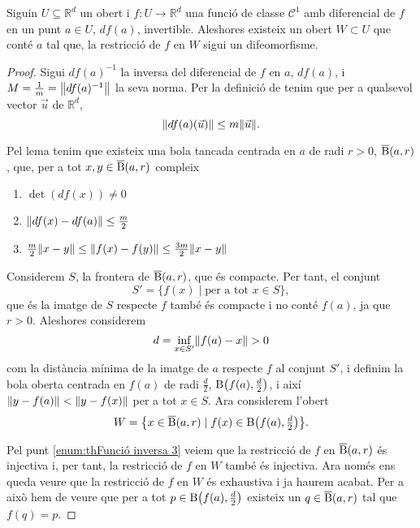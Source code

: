 \documentclass[../Apunts.tex]{subfiles}
\begin{document}
	\begin{theorem}
		\label{thm:Funció inversa}
		Siguin \(U\subseteq\mathbb{R}^{d}\) un obert i \(f\colon U\to\mathbb{R}^{d}\) una funció de classe \(\mathcal{C}^{1}\) amb diferencial de \(f\) en un punt \(a\in U\), \(df(a)\), invertible. Aleshores existeix un obert \(W\subset U\) que conté \(a\) tal que, la restricció de \(f\) en \(W\) sigui un difeomorfisme.
		\begin{proof}
			Sigui \(df(a)^{-1}\) la inversa del diferencial de \(f\) en \(a\), \(df(a)\), i \(M=\frac{1}{m}=\norm{df(a)^{-1}}\) la seva norma. Per la definició de  tenim que per a qualsevol vector \(\vec{u}\) de \(\mathbb{R}^{d}\),
			\[\norm{df(a)(\vec{u})}\leq m\norm{\vec{u}}.\]
			
			Pel lema  tenim que existeix una bola tancada centrada en \(a\) de radi \(r>0\), \(\overline{\operatorname{B}}(a,r)\), que, per a tot \(x,y\in\overline{\operatorname{B}}(a,r)\) compleix
			\begin{enumerate}
				\item\label{enum:thFunció inversa 1} \(\det(df(x))\neq0\)
				\item\label{enum:thFunció inversa 2} \(\norm{df(x)-df(a)}\leq\frac{m}{2}\)
				\item\label{enum:thFunció inversa 3} \(\frac{m}{2}\norm{x-y} \leq\norm{f(x)-f(y)}\leq\frac{3m}{2}\norm{x-y}\)
			\end{enumerate}
			
			Considerem \(S\), la frontera de \(\overline{\operatorname{B}}(a,r)\), que és compacte. Per tant, el conjunt
			\[S'=\{f(x)\mid\text{per a tot }x\in S\},\]
			que és la imatge de \(S\) respecte \(f\) també és compacte i no conté \(f(a)\), ja que \(r>0\). Aleshores considerem
			\[d=\inf_{x\in S'}\norm{f(a)-x}>0\]
			com la distància mínima de la imatge de \(a\) respecte \(f\) al conjunt \(S'\), i definim la bola oberta centrada en \(f(a)\) de radi \(\frac{d}{2}\), \(\B\left(f(a),\tfrac{d}{2}\right)\), i així \(\norm{y-f(a)}<\norm{y-f(x)}\) per a tot \(x\in S\).
			Ara considerem l'obert
			\[W=\left\{x\in\overline{\B}(a,r)\mid f(x)\in\B\left(f(a),\tfrac{d}{2}\right)\right\}.\]
			
			Pel punt \eqref{enum:thFunció inversa 3} veiem que la restricció de \(f\) en \(\overline{\operatorname{B}}(a,r)\) és injectiva i, per tant, la restricció de \(f\) en \(W\) també és injectiva. Ara només ens queda veure que la restricció de \(f\) en \(W\) és exhaustiva i ja haurem acabat. Per a això hem de veure que per a tot \(p\in\B\left(f(a),\tfrac{d}{2}\right)\) existeix un \(q\in\overline{\operatorname{B}}(a,r)\) tal que \(f(q)=p\).
			

\end{proof}
\end{theorem}
\end{document}
